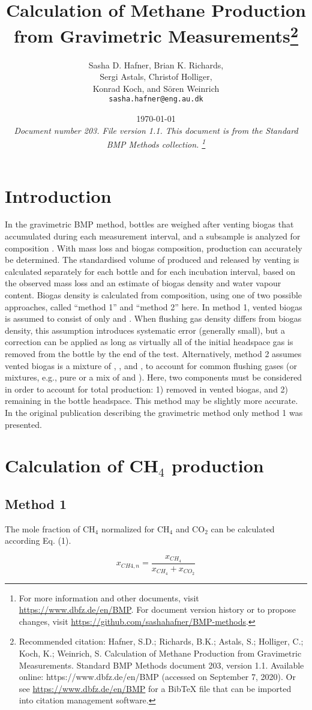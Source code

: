 \documentclass[]{article}
\title {Calculation of Methane Production from Gravimetric Measurements\footnote{
  Recommended citation: 
Hafner, S.D.; Richards, B.K.; Astals, S.; Holliger, C.; Koch, K.; Weinrich, S. Calculation of Methane Production from Gravimetric Measurements. Standard BMP Methods document 203, version 1.1. Available online: https://www.dbfz.de/en/BMP (accessed on September 7, 2020).
  \newline
  Or see \url{https://www.dbfz.de/en/BMP} for a BibTeX file that can be imported into citation management software.
}}
\author{Sasha D. Hafner, Brian K. Richards, \\ Sergi Astals, Christof Holliger, \\ Konrad Koch, and S{\"o}ren Weinrich
\\
\texttt{sasha.hafner@eng.au.dk}
}
\date{\today \\
\bigskip
\textit{
  Document number 203.
  File version 1.1. 
  This document is from the Standard BMP Methods collection.
    \footnote{For more information and other documents, visit \url{https://www.dbfz.de/en/BMP}. 
    For document version history or to propose changes, visit \url{https://github.com/sashahafner/BMP-methods}.}
}
}
\begin{document}
\maketitle

\section{Introduction}
In the gravimetric BMP method, bottles are weighed after venting biogas that accumulated during each measurement interval, and a subsample is analyzed for composition \cite{validation}.
With mass loss and biogas composition,  production can accurately be determined.
The standardised volume of  produced and released by venting is calculated separately for each bottle and for each incubation interval, based on the observed mass loss and an estimate of biogas density and water vapour content. 
Biogas density is calculated from composition, using one of two possible approaches, called ``method 1'' and ``method 2'' here.
In method 1, vented biogas is assumed to consist of only  and . 
When flushing gas density differs from biogas density, this assumption introduces systematic error (generally small), but a correction can be applied as long as virtually all of the initial headspace gas is removed from the bottle by the end of the test. 
Alternatively, method 2 assumes vented biogas is a mixture of , , and , to account for common flushing gases (or mixtures, e.g., pure  or a mix of  and ).
Here, two components must be considered in order to account for total  production: 1)  removed in vented biogas, and 2)  remaining in the bottle headspace.
This method may be slightly more accurate.
In the original publication describing the gravimetric method \cite{validation} only method 1 was presented.

\section{Calculation of CH$_4$ production}

\subsection{Method 1}

The mole fraction of CH$_{4}$ normalized for CH$_{4}$ and CO$_{2}$ can be calculated according Eq. (1). 

\begin{equation}
  \label{eq:xch4n}
    x_{CH{4},n} = \frac{x_{CH_4}}{x_{CH_4} + x_{CO_2}}
\end{equation}
\end{document}
